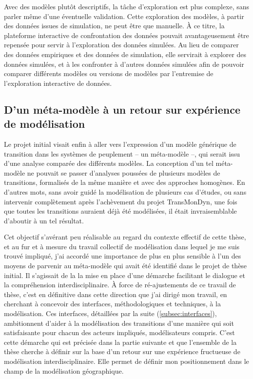 Avec des modèles plutôt descriptifs, la tâche d'exploration est plus complexe, sans parler même d'une éventuelle validation.
Cette exploration des modèles, à partir des données issues de simulation, ne peut être que manuelle.
À ce titre, la plateforme interactive de confrontation des données pouvait avantageusement être repensée pour servir à l'exploration des données simulées.
Au lieu de comparer des données empiriques et des données de simulation, elle servirait à explorer des données simulées, et à les confronter à d'autres données simulées afin de pouvoir comparer différents modèles ou versions de modèles par l'entremise de l'exploration interactive de données.

\subsection{D'un méta-modèle à un retour sur expérience de modélisation}

Le projet initial visait enfin à aller vers l'expression d'un modèle générique de transition dans les systèmes de peuplement -- un méta-modèle --, qui serait issu d'une analyse comparée des différents modèles.
La conception d'un tel méta-modèle ne pouvait se passer d'analyses poussées de plusieurs modèles de transitions, formalisés de la même manière et avec des approches homogènes.
En d'autres mots, sans avoir \og guidé\fg{} la modélisation de plusieurs cas d'études, ou sans intervenir complètement après l'achèvement du projet TransMonDyn, une fois que toutes les transitions auraient déjà été modélisées, il était invraisemblable d'aboutir à un tel résultat.

Cet objectif s'avérant peu réalisable au regard du contexte effectif de cette thèse, et au fur et à mesure du travail collectif de modélisation dans lequel je me suis trouvé impliqué, j'ai accordé une importance de plus en plus sensible à l'un des moyens de parvenir au méta-modèle qui avait été identifié dans le projet de thèse initial.
Il s'agissait de la \og la mise en place d'une démarche facilitant le dialogue et la compréhension interdisciplinaire\fg{}.
À force de ré-ajustements de ce travail de thèse, c'est en définitive dans cette direction que j'ai dirigé mon travail, en cherchant à concevoir des \og interfaces\fg{}, méthodologiques et techniques, à la modélisation.
Ces interfaces, détaillées par la suite (\cref{subsec:interfaces}), ambitionnent d'aider à la modélisation des transitions d'une manière qui soit satisfaisante pour chacun des acteurs impliqués, modélisateurs compris.
C'est cette démarche qui est précisée dans la partie suivante et que l'ensemble de la thèse cherche à définir sur la base d'un retour sur une expérience fructueuse de modélisation interdisciplinaire.
Elle permet de définir mon positionnement dans le champ de la modélisation géographique.


